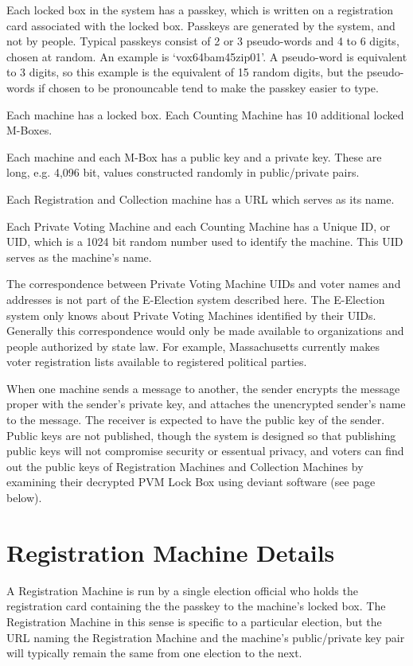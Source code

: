 \documentclass[12pt]{article}
\newcommand{\pagref}[1]{(see page~\pageref{#1} below)}
\begin{document}
Each locked box in the system has a passkey, which is
written on a registration card associated with the locked
box.  Passkeys are generated by the system, and not by
people.  Typical passkeys consist of 2 or 3 pseudo-words
and 4 to 6 digits, chosen at random.  An example is
`vox64bam45zip01'.  A pseudo-word is equivalent to 3
digits, so this example is the equivalent of 15 random
digits, but the pseudo-words if chosen to be pronouncable
tend to make the passkey easier to type.

Each machine has a locked box.  Each Counting
Machine has 10 additional locked M-Boxes.

Each machine and each M-Box has a public key and a private key.  These
are long, e.g. 4,096 bit, values constructed randomly
in public/private pairs.

Each Registration and Collection
machine has a URL which serves as its name.

Each Private Voting Machine and each Counting Machine
has a Unique ID, or UID, which is a 1024 bit random number
used to identify the machine.  This UID serves as the
machine's name.

The correspondence between Private Voting Machine UIDs
and voter names and addresses is not part of the E-Election system
described here.  The E-Election system only knows about
Private Voting Machines identified by their UIDs.
Generally this correspondence would only be made available
to organizations and people authorized by state law.
For example, Massachusetts currently makes voter registration lists
available to registered political parties.

When one machine sends a message to another, the sender
encrypts the message proper with the sender's private
key, and attaches the unencrypted sender's name to the
message.  The receiver is expected to have the public
key of the sender.  Public keys are not published,
though the system is designed so that publishing public
keys will not compromise security or essentual privacy,
and voters can find out the public keys of Registration
Machines and Collection Machines by examining their
decrypted PVM Lock Box using deviant software
\pagref{DEVIANT-SOFTWARE}.

\section{Registration Machine Details}

A Registration Machine is run by a single election official
who holds the registration card containing the the passkey to
the machine's locked box.  The Registration Machine in this
sense is specific to a particular election, but the
URL naming the Registration Machine and the machine's
public/private key pair will typically remain the same from
one election to the next.
\end{document}
